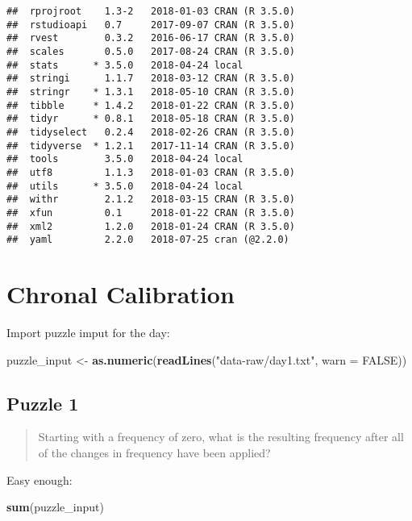 \documentclass[]{book}
\newenvironment{Shaded}{\begin{snugshade}}{\end{snugshade}}
\newcommand{\KeywordTok}[1]{\textcolor[rgb]{0.13,0.29,0.53}{\textbf{#1}}}
\newcommand{\DataTypeTok}[1]{\textcolor[rgb]{0.13,0.29,0.53}{#1}}
\newcommand{\StringTok}[1]{\textcolor[rgb]{0.31,0.60,0.02}{#1}}
\newcommand{\OtherTok}[1]{\textcolor[rgb]{0.56,0.35,0.01}{#1}}
\newcommand{\NormalTok}[1]{#1}
\theoremstyle{definition}
\theoremstyle{definition}
\theoremstyle{definition}
\theoremstyle{remark}
\begin{document}
\begin{verbatim}
##  rprojroot    1.3-2   2018-01-03 CRAN (R 3.5.0)
##  rstudioapi   0.7     2017-09-07 CRAN (R 3.5.0)
##  rvest        0.3.2   2016-06-17 CRAN (R 3.5.0)
##  scales       0.5.0   2017-08-24 CRAN (R 3.5.0)
##  stats      * 3.5.0   2018-04-24 local         
##  stringi      1.1.7   2018-03-12 CRAN (R 3.5.0)
##  stringr    * 1.3.1   2018-05-10 CRAN (R 3.5.0)
##  tibble     * 1.4.2   2018-01-22 CRAN (R 3.5.0)
##  tidyr      * 0.8.1   2018-05-18 CRAN (R 3.5.0)
##  tidyselect   0.2.4   2018-02-26 CRAN (R 3.5.0)
##  tidyverse  * 1.2.1   2017-11-14 CRAN (R 3.5.0)
##  tools        3.5.0   2018-04-24 local         
##  utf8         1.1.3   2018-01-03 CRAN (R 3.5.0)
##  utils      * 3.5.0   2018-04-24 local         
##  withr        2.1.2   2018-03-15 CRAN (R 3.5.0)
##  xfun         0.1     2018-01-22 CRAN (R 3.5.0)
##  xml2         1.2.0   2018-01-24 CRAN (R 3.5.0)
##  yaml         2.2.0   2018-07-25 cran (@2.2.0)
\end{verbatim}

\chapter{Chronal Calibration}\label{day1}

Import puzzle imput for the day:

\begin{Shaded}
\begin{Highlighting}[]
\NormalTok{puzzle_input <-}\StringTok{ }\KeywordTok{as.numeric}\NormalTok{(}\KeywordTok{readLines}\NormalTok{(}\StringTok{"data-raw/day1.txt"}\NormalTok{, }\DataTypeTok{warn =} \OtherTok{FALSE}\NormalTok{))}
\end{Highlighting}
\end{Shaded}

\section{Puzzle 1}\label{puzzle-1}

\begin{quote}
Starting with a frequency of zero, what is the resulting frequency after
all of the changes in frequency have been applied?
\end{quote}

Easy enough:

\begin{Shaded}
\begin{Highlighting}[]
\KeywordTok{sum}\NormalTok{(puzzle_input)}
\end{Highlighting}
\end{Shaded}
\end{document}
